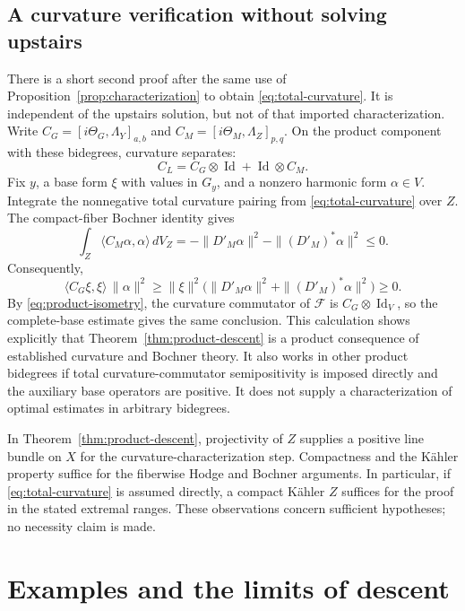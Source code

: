 \documentclass[11pt,reqno]{amsart}
\numberwithin{equation}{section}
\theoremstyle{definition}
\theoremstyle{remark}
\newcommand{\cF}{\mathcal F}
\newcommand{\Id}{\operatorname{Id}}
\newcommand{\ip}[2]{\langle #1,#2\rangle}
\begin{document}
\subsection{A curvature verification without solving upstairs}\label{sec:curvature-verification}
There is a short second proof after the same use of Proposition~\ref{prop:characterization} to obtain \eqref{eq:total-curvature}. It is independent of the upstairs solution, but not of that imported characterization. Write
$C_G=[i\Theta_G,\Lambda_Y]_{a,b}$ and
$C_M=[i\Theta_M,\Lambda_Z]_{p,q}$.
On the product component with these bidegrees, curvature separates:
\begin{equation}\label{eq:split-curvature}
 C_L=C_G\otimes\Id+\Id\otimes C_M.
\end{equation}
Fix $y$, a base form $\xi$ with values in $G_y$, and a nonzero harmonic form $\alpha\in V$. Integrate the nonnegative total curvature pairing from \eqref{eq:total-curvature} over $Z$. The compact-fiber Bochner identity gives
\[
 \int_Z\ip{C_M\alpha}{\alpha}\,dV_Z
   =-\|D'_M\alpha\|^2-\|(D'_M)^*\alpha\|^2\leq0.
\]
Consequently,
\begin{equation}\label{eq:independent-check}
 \ip{C_G\xi}{\xi}\,\|\alpha\|^2
 \geq\|\xi\|^2
       \bigl(\|D'_M\alpha\|^2+\|(D'_M)^*\alpha\|^2\bigr)
 \geq0.
\end{equation}
By \eqref{eq:product-isometry}, the curvature commutator of $\cF$ is $C_G\otimes\Id_V$, so the complete-base estimate gives the same conclusion. This calculation shows explicitly that Theorem~\ref{thm:product-descent} is a product consequence of established curvature and Bochner theory. It also works in other product bidegrees if total curvature-commutator semipositivity is imposed directly and the auxiliary base operators are positive. It does not supply a characterization of optimal estimates in arbitrary bidegrees.

In Theorem~\ref{thm:product-descent}, projectivity of $Z$ supplies a positive line bundle on $X$ for the curvature-characterization step. Compactness and the K\"ahler property suffice for the fiberwise Hodge and Bochner arguments. In particular, if \eqref{eq:total-curvature} is assumed directly, a compact K\"ahler $Z$ suffices for the proof in the stated extremal ranges. These observations concern sufficient hypotheses; no necessity claim is made.

\section{Examples and the limits of descent}\label{sec:examples}
\end{document}
